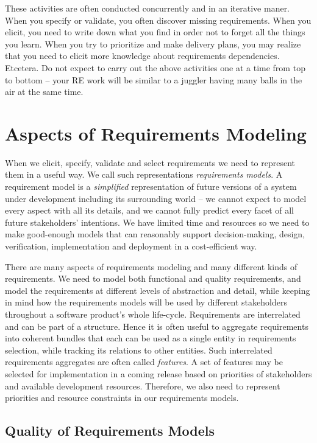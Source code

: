 These activities are often conducted concurrently and in an iterative maner. When you specify or validate, you often discover missing requirements. When you elicit, you need to write down what you find in order not to forget all the things you learn. When you try to prioritize and make delivery plans, you may realize that you need to elicit more knowledge about requirements dependencies. Etcetera. Do not expect to carry out the above activities one at a time from top to bottom -- your RE work will be similar to a juggler having many balls in the air at the same time. 

\section*{Aspects of Requirements Modeling}

When we elicit, specify, validate and select requirements we need to represent them in a useful way. We call such representations \textit{requirements models}. A requirement model is a \emph{simplified} representation of future versions of a system under development including its surrounding world -- we cannot expect to model every aspect with all its details, and we cannot fully predict every facet of all future stakeholders' intentions. We have limited time and resources so we need to make good-enough models that can reasonably support decision-making, design, verification, implementation and deployment in a cost-efficient way.

There are many aspects of requirements modeling and many different kinds of requirements. We need to model both functional and quality requirements, and model the requirements at different levels of abstraction and detail, while keeping in mind how the requirements models will be used by different stakeholders throughout a software product's whole life-cycle. Requirements are interrelated and can be part of a structure. Hence it is often useful to aggregate requirements into coherent bundles that each can be used as a single entity in requirements selection, while tracking its relations to other entities. Such interrelated requirements aggregates are often called \emph{features}. A set of features may be selected for implementation in a coming release based on priorities of stakeholders and available development resources. Therefore, we also need to represent priorities and resource constraints in our requirements models.

\subsection*{Quality of Requirements Models}

